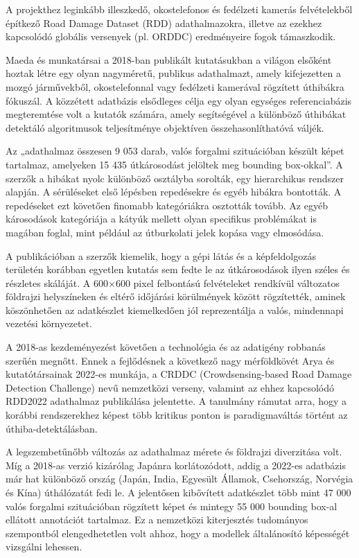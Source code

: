 A projekthez leginkább illeszkedő, okostelefonos és fedélzeti kamerás
felvételekből építkező Road Damage Dataset (RDD) adathalmazokra, illetve
az ezekhez kapcsolódó globális versenyek (pl. ORDDC) eredményeire fogok
támaszkodik. \cite{aryaCrowdsensingbasedRoadDamage2022}

Maeda és munkatársai a 2018-ban publikált kutatásukban a világon
elsőként hoztak létre egy olyan nagyméretű, publikus adathalmazt, amely
kifejezetten a mozgó járművekből, okostelefonnal vagy fedélzeti
kamerával rögzített úthibákra fókuszál. A közzétett adatbázis elsődleges
célja egy olyan egységes referenciabázis megteremtése volt a kutatók
számára, amely segítségével a különböző úthibákat detektáló algoritmusok
teljesítménye objektíven összehasonlíthatóvá váljék.

Az „adathalmaz összesen 9 053 darab, valós forgalmi szituációban készült
képet tartalmaz, amelyeken 15 435 útkárosodást jelöltek meg bounding
box-okkal''\cite{maedaRoadDamageDetection2018}. A szerzők a hibákat nyolc különböző osztályba
sorolták, egy hierarchikus rendszer alapján. A sérüléseket első lépésben
repedésekre és egyéb hibákra bontották. A repedéseket ezt követően
finomabb kategóriákra osztották tovább. Az egyéb károsodások kategóriája
a kátyúk mellett olyan specifikus problémákat is magában foglal, mint
például az útburkolati jelek kopása vagy elmosódása.

A publikációban a szerzők kiemelik, hogy a gépi látás és a
képfeldolgozás területén korábban egyetlen kutatás sem fedte le az
útkárosodások ilyen széles és részletes skáláját. A 600×600 pixel
felbontású felvételeket rendkívül változatos földrajzi helyszíneken és
eltérő időjárási körülmények között rögzítették, aminek köszönhetően az
adatkészlet kiemelkedően jól reprezentálja a valós, mindennapi vezetési
környezetet. \cite{maedaRoadDamageDetection2018}

A 2018-as kezdeményezést követően a technológia és az adatigény robbanás
szerűén megnőtt. Ennek a fejlődésnek a következő nagy mérföldkövét Arya
és kutatótársainak 2022-es munkája, a CRDDC (Crowdsensing-based Road
Damage Detection Challenge) nevű nemzetközi verseny, valamint az ehhez
kapcsolódó RDD2022 adathalmaz publikálása jelentette. A tanulmány
rámutat arra, hogy a korábbi rendszerekhez képest több kritikus ponton
is paradigmaváltás történt az úthiba-detektálásban.

A legszembetűnőbb változás az adathalmaz mérete és földrajzi
diverzitása volt. Míg a 2018-as verzió kizárólag Japánra korlátozódott,
addig a 2022-es adatbázis már hat különböző ország (Japán, India,
Egyesült Államok, Csehország, Norvégia és Kína) úthálózatát fedi le. A
jelentősen kibővített adatkészlet több mint 47 000 valós forgalmi
szituációban rögzített képet és mintegy 55 000 bounding box-al ellátott
annotációt tartalmaz. Ez a nemzetközi kiterjesztés tudományos
szempontból elengedhetetlen volt ahhoz, hogy a modellek általánosító
képességét vizsgálni lehessen.

